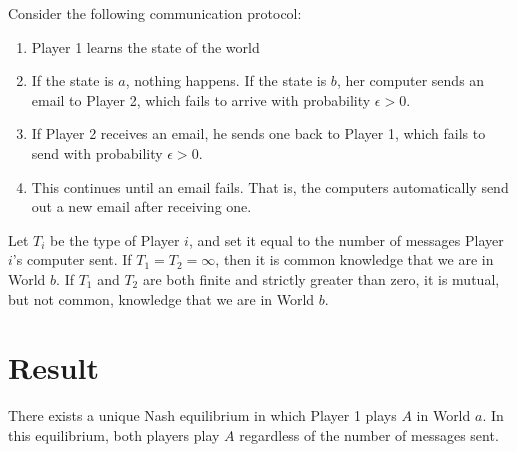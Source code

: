 Consider the following communication protocol:

\begin{enumerate}
	\item Player 1 learns the state of the world
	\item If the state is $a$, nothing happens.  If the state is $b$, her computer sends an email to Player 2, which fails to arrive with probability $\epsilon>0$.
	\item If Player 2 receives an email, he sends one back to Player 1, which fails to send with probability $\epsilon>0$.
	\item This continues until an email fails.  That is, the computers automatically send out a new email after receiving one.
\end{enumerate}

Let $T_i$ be the type of Player $i$, and set it equal to the number of messages Player $i$'s computer sent.  If $T_1=T_2=\infty$, then it is common knowledge that we are in World $b$.  If $T_1$ and $T_2$ are both finite and strictly greater than zero, it is mutual, but not common, knowledge that we are in World $b$.

\section*{Result}
\begin{proposition}
	There exists a unique Nash equilibrium in which Player 1 plays $A$ in World $a$.  In this equilibrium, both players play $A$ regardless of the number of messages sent.
\end{proposition}

